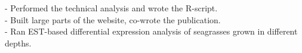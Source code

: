 \documentclass[]{friggeri-cv} %
\begin{document}
\cite{mason2014high}
- Performed the technical analysis and wrote the R-script.\\

\cite{greshake2014opensnp}
- Built large parts of the website, co-wrote the publication.\\

\cite{dattolo2013acclimation}
- Ran EST-based differential expression analysis of seagrasses grown in different depths.\\





\end{document}
